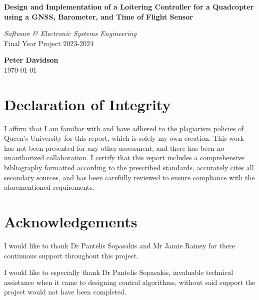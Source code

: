 \documentclass{article}
\begin{document}
\onehalfspacing

\begin{titlepage}
    \begin{center}
        
        \textbf{\Large Design and Implementation of a Loitering Controller for a
        Quadcopter using a GNSS, Barometer, and Time of Flight Sensor}\\
        \vspace{1.5cm} 
        
        \textit{\large Software \& Electronic Systems Engineering}\\
        \vspace{0.5cm} 
        Final Year Project 2023-2024\\
        \vspace{2cm} 
        
        \textbf{Peter Davidson}\\
        \vspace{0.5cm} 
        \today
        
        \vfill
        
    \end{center}
    \thispagestyle{fancy}
\end{titlepage}
 
\newpage
\pagestyle{plain}

\section*{Declaration of Integrity}
I affirm that I am familiar with and have adhered to the plagiarism policies of
Queen's University for this report, which is solely my own creation. This work
has not been presented for any other assessment, and there has been no
unauthorized collaboration. I certify that this report includes a comprehensive
bibliography formatted according to the prescribed standards, accurately cites
all secondary sources, and has been carefully reviewed to ensure compliance with
the aforementioned requirements.
\newpage

\section*{Acknowledgements}
I would like to thank Dr Pantelis Sopasakis and Mr Jamie Rainey for there
continuous support throughout this project. 

I would like to especially thank Dr Pantelis Sopasakis, invaluable technical
assistance when it came to designing control algorithms, without said support
the project would not have been completed.
\newpage
\end{document}
